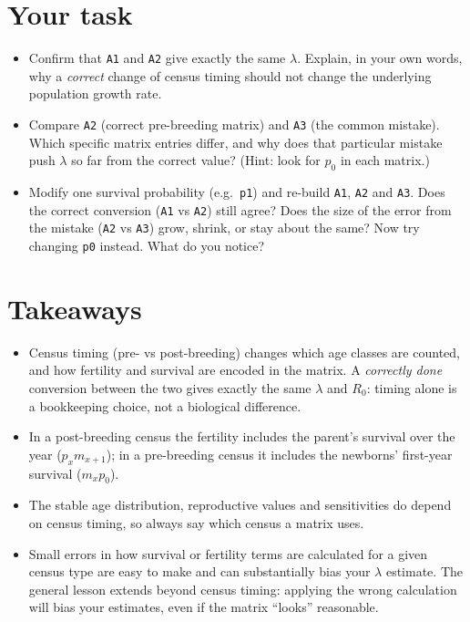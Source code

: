 \documentclass[
  a4paper]{book}
\providecommand{\tightlist}{%
  \setlength{\itemsep}{0pt}\setlength{\parskip}{0pt}}
\begin{document}
\section{Your task}\label{your-task-9}

\begin{itemize}
\tightlist
\item
  Confirm that \texttt{A1} and \texttt{A2} give exactly the same \(\lambda\). Explain, in your own words, why a \emph{correct} change of census timing should not change the underlying population growth rate.
\item
  Compare \texttt{A2} (correct pre-breeding matrix) and \texttt{A3} (the common mistake). Which specific matrix entries differ, and why does that particular mistake push \(\lambda\) so far from the correct value? (Hint: look for \(p_0\) in each matrix.)
\item
  Modify one survival probability (e.g.~\texttt{p1}) and re-build \texttt{A1}, \texttt{A2} and \texttt{A3}. Does the correct conversion (\texttt{A1} vs \texttt{A2}) still agree? Does the size of the error from the mistake (\texttt{A2} vs \texttt{A3}) grow, shrink, or stay about the same? Now try changing \texttt{p0} instead. What do you notice?
\end{itemize}

\section{Takeaways}\label{takeaways-9}

\begin{itemize}
\tightlist
\item
  Census timing (pre- vs post-breeding) changes which age classes are counted, and how fertility and survival are encoded in the matrix. A \emph{correctly done} conversion between the two gives exactly the same \(\lambda\) and \(R_0\): timing alone is a bookkeeping choice, not a biological difference.
\item
  In a post-breeding census the fertility includes the parent's survival over the year (\(p_x m_{x+1}\)); in a pre-breeding census it includes the newborns' first-year survival (\(m_x p_0\)).
\item
  The stable age distribution, reproductive values and sensitivities do depend on census timing, so always say which census a matrix uses.
\item
  Small errors in how survival or fertility terms are calculated for a given census type are easy to make and can substantially bias your \(\lambda\) estimate. The general lesson extends beyond census timing: applying the wrong calculation will bias your estimates, even if the matrix ``looks'' reasonable.
\end{itemize}
\end{document}
